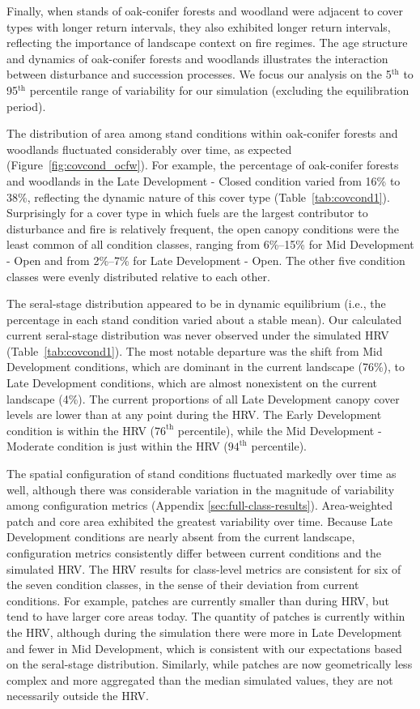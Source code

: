 Finally, when stands of oak-conifer forests and woodland were adjacent to cover types with longer return intervals, they also exhibited longer return intervals, reflecting the importance of landscape context on fire regimes.
The age structure and dynamics of oak-conifer forests and woodlands illustrates the interaction between disturbance and succession processes. We focus our analysis on the 5$^{\text{th}}$ to 95$^{\text{th}}$ percentile range of variability for our simulation (excluding the equilibration period).

The distribution of area among stand conditions within oak-conifer forests and woodlands fluctuated considerably over time, as expected (Figure~\ref{fig:covcond_ocfw}). For example, the percentage of oak-conifer forests and woodlands in the Late Development - Closed condition varied from 16\% to 38\%, reflecting the dynamic nature of this cover type (Table~\ref{tab:covcond1}). Surprisingly for a cover type in which fuels are the largest contributor to disturbance and fire is relatively frequent, the open canopy conditions were the least common of all condition classes, ranging from 6\%--15\% for Mid Development - Open and from 2\%--7\% for Late Development - Open. The other five condition classes were evenly distributed relative to each other.

The seral-stage distribution appeared to be in dynamic equilibrium (i.e., the percentage in each stand condition varied about a stable mean). Our calculated current seral-stage distribution was never observed under the simulated HRV (Table~\ref{tab:covcond1}). The most notable departure was the shift from Mid Development conditions, which are dominant in the current landscape (76\%), to Late Development conditions, which are almost nonexistent on the current landscape (4\%). The current proportions of all Late Development canopy cover levels are lower than at any point during the HRV.  The Early Development condition is within the HRV ($76^{\text{th}}$ percentile), while the Mid Development - Moderate condition is just within the HRV ($94^{\text{th}}$ percentile).

The spatial configuration of stand conditions fluctuated markedly over time as well, although there was considerable variation in the magnitude of variability among configuration metrics (Appendix \ref{sec:full-class-results}). Area-weighted patch and core area exhibited the greatest variability over time. Because Late Development conditions are nearly absent from the current landscape, configuration metrics consistently differ between current conditions and the simulated HRV. The HRV results for class-level metrics are consistent for six of the seven condition classes, in the sense of their deviation from current conditions. For example, patches are currently smaller than during HRV, but tend to have larger core areas today. The quantity of patches is currently within the HRV, although during the simulation there were more in Late Development and fewer in Mid Development, which is consistent with our expectations based on the seral-stage distribution. Similarly, while patches are now geometrically less complex and more aggregated than the median simulated values, they are not necessarily outside the HRV.


